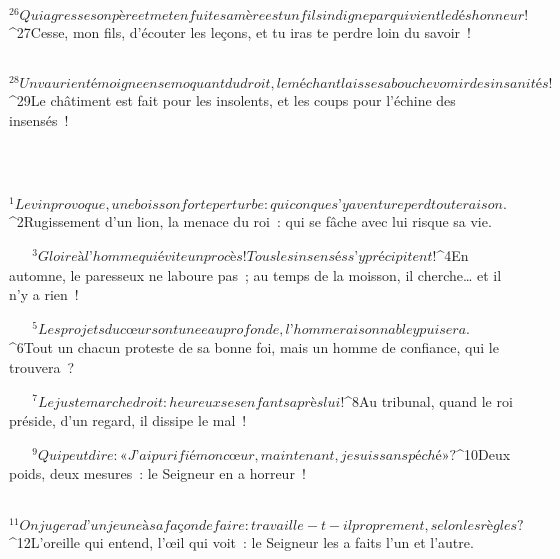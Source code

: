            
         
${}^{26}Qui agresse son père et met en fuite sa mère
        est un fils indigne par qui vient le déshonneur !
        
           
         
${}^{27}Cesse, mon fils, d’écouter les leçons,
        et tu iras te perdre loin du savoir !
        
           
         
${}^{28}Un vaurien témoigne en se moquant du droit,
        le méchant laisse sa bouche vomir des insanités !
        
           
         
${}^{29}Le châtiment est fait pour les insolents,
        et les coups pour l’échine des insensés !
        
           
       
      
         
      \bchapter{}
${}^{1}Le vin provoque, une boisson forte perturbe :
        quiconque s’y aventure perd toute raison.
        
           
         
${}^{2}Rugissement d’un lion, la menace du roi :
        qui se fâche avec lui risque sa vie.
        
           
         
${}^{3}Gloire à l’homme qui évite un procès !
        Tous les insensés s’y précipitent !
        
           
         
${}^{4}En automne, le paresseux ne laboure pas ;
        au temps de la moisson, il cherche… et il n’y a rien !
        
           
         
${}^{5}Les projets du cœur sont une eau profonde,
        l’homme raisonnable y puisera.
        
           
         
${}^{6}Tout un chacun proteste de sa bonne foi,
        mais un homme de confiance, qui le trouvera ?
        
           
         
${}^{7}Le juste marche droit :
        heureux ses enfants après lui !
        
           
         
${}^{8}Au tribunal, quand le roi préside,
        d’un regard, il dissipe le mal !
        
           
         
${}^{9}Qui peut dire : « J’ai purifié mon cœur,
        maintenant, je suis sans péché » ?
        
           
         
${}^{10}Deux poids, deux mesures :
        le Seigneur en a horreur !
        
           
         
${}^{11}On jugera d’un jeune à sa façon de faire :
        travaille-t-il proprement, selon les règles ?
        
           
         
${}^{12}L’oreille qui entend, l’œil qui voit :
        le Seigneur les a faits l’un et l’autre.
        
